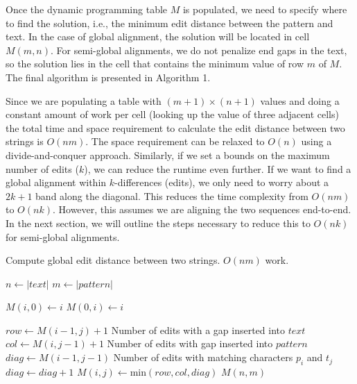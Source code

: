 Once the dynamic programming table $M$ is populated, we need to specify where to find the solution, i.e., the minimum edit distance between the pattern and text.
In the case of global alignment, the solution will be located in cell $M(m,n)$.
For semi-global alignments, we do not penalize end gaps in the text, so the solution lies in the cell that contains the minimum value of row $m$ of $M$. The final algorithm is presented in Algorithm 1.

Since we are populating a table with $(m+1) \times (n+1)$ values and doing a constant amount of work per cell (looking up the value of three adjacent cells) the total time and space requirement to calculate the edit distance between two strings is $O(nm)$.
The space requirement can be relaxed to $O(n)$ using a divide-and-conquer approach\cite{gusfield_algorithms_1997}.
Similarly, if we set a bounds on the maximum number of edits ($k$), we can reduce the runtime even further.
If we want to find a global alignment within $k$-differences (edits), we only need to worry about a $2k+1$ band along the diagonal.
This reduces the time complexity from $O(nm)$ to $O(nk)$.
However, this assumes we are aligning the two sequences end-to-end.
In the next section, we will outline the steps necessary to reduce this to $O(nk)$ for semi-global alignments.


 \begin{algorithm}
 \caption{Compute global edit distance between two strings. $O(nm)$ work.}\label{edit_distance}
 \begin{algorithmic}[1]
 \State $n\gets |text|$
 \State $m\gets |pattern|$

    \State $M(i,0) \gets i$ \EndFor
  \State $M(0,i) \gets i$
\EndFor

  \State $row \gets M(i-1,j) + 1$ \Comment Number of edits with a gap inserted into $text$
  \State $col \gets M(i,j-1) + 1$ \Comment Number of edits with gap inserted into $pattern$
  \State $diag \gets M(i-1, j-1)$ \Comment Number of edits with matching characters $p_i$ and $t_j$
    $diag \gets diag +  1$ \EndIf
  \State $M(i,j) \gets \text{min}(row,col,diag)$
\EndFor
\EndFor
\Return $M(n,m)$
\EndProcedure
\end{algorithmic}
\end{algorithm}



